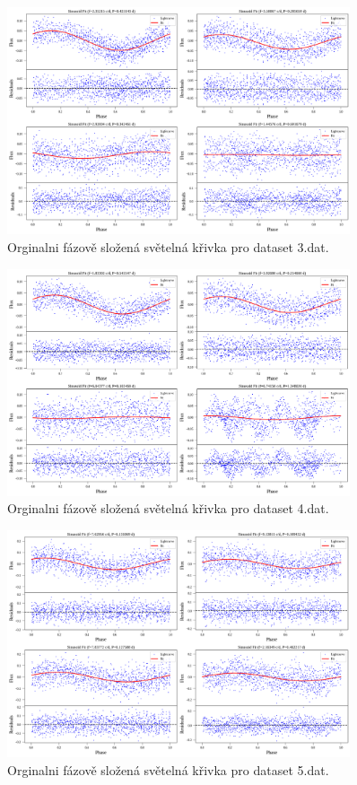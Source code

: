 \documentclass[a4paper,11pt,twocolumn]{article}
\begin{document}
    \begin{figure}
        \centering
        \includegraphics[width=0.9\textwidth]{phase/3_phase_folded_orig.png}
        \caption{Orginalni fázově složená světelná křivka pro dataset 3.dat.}
        \label{fig:3_phase_folded_orig}
    \end{figure}

    \begin{figure}
        \centering
        \includegraphics[width=0.9\textwidth]{phase/4_phase_folded_orig.png}
        \caption{Orginalni fázově složená světelná křivka pro dataset 4.dat.}
        \label{fig:4_phase_folded_orig}
    \end{figure}

    \begin{figure}
        \centering
        \includegraphics[width=0.9\textwidth]{phase/5_phase_folded_orig.png}
        \caption{Orginalni fázově složená světelná křivka pro dataset 5.dat.}
        \label{fig:5_phase_folded_orig}
    \end{figure}
\end{document}
